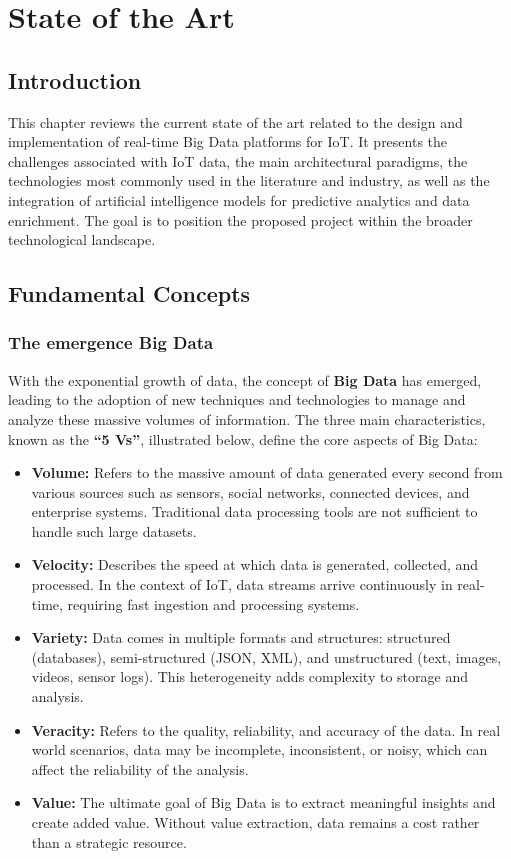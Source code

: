 \chapter{State of the Art}

\section{Introduction}
This chapter reviews the current state of the art related to the design and
implementation of real-time Big Data platforms for IoT. It presents the
challenges associated with IoT data, the main architectural paradigms, the
technologies most commonly used in the literature and industry, as well as
the integration of artificial intelligence models for predictive analytics
and data enrichment. The goal is to position the proposed project within
the broader technological landscape.

\section{Fundamental Concepts}
\subsection{The emergence Big Data}
With the exponential growth of data, the concept of \textbf{Big Data} has
emerged, leading to the adoption of new techniques and technologies to manage
and analyze these massive volumes of information. The three main
characteristics, known as the \textbf{``5 Vs''}, illustrated below, define the
core aspects of Big Data:
\begin{itemize}
    \item \textbf{Volume:} Refers to the massive amount of data generated every second from various sources such as sensors, social networks, connected devices, and enterprise systems. Traditional data processing tools are not sufficient to handle such large datasets.
    
    \item \textbf{Velocity:} Describes the speed at which data is generated, collected, and processed. In the context of IoT, data streams arrive continuously in real-time, requiring fast ingestion and processing systems.
    
    \item \textbf{Variety:} Data comes in multiple formats and structures: structured (databases), semi-structured (JSON, XML), and unstructured (text, images, videos, sensor logs). This heterogeneity adds complexity to storage and analysis.
    
    \item \textbf{Veracity:} Refers to the quality, reliability, and accuracy of the data. In real world scenarios, data may be incomplete, inconsistent, or noisy, which can affect the reliability of the analysis.
    
    \item \textbf{Value:} The ultimate goal of Big Data is to extract meaningful insights and create added value. Without value extraction, data remains a cost rather than a strategic resource.
\end{itemize}

